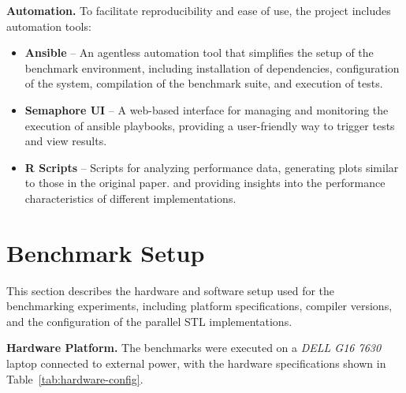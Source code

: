 \documentclass[sigconf]{acmart}
\newcommand{\mypar}[1]{{\bf #1.}}
\begin{document}
\mypar{Automation} To facilitate reproducibility and ease of use, the project includes automation tools:
\begin{itemize}
      \item \textbf{Ansible} – An agentless automation tool that simplifies the setup of the benchmark environment,
            including installation of dependencies, configuration of the system, compilation of the benchmark suite, and execution of tests.
      \item \textbf{Semaphore UI} – A web-based interface for managing and monitoring the execution of ansible playbooks,
            providing a user-friendly way to trigger tests and view results.
      \item \textbf{R Scripts} – Scripts for analyzing performance data, generating plots similar to those in the original paper.
            and providing insights into the performance characteristics of different implementations.
\end{itemize}

\section{Benchmark Setup}\label{sec:benchmark_setup}

This section describes the hardware and software setup used for the
benchmarking experiments, including platform specifications, compiler versions,
and the configuration of the parallel STL implementations.

\mypar{Hardware Platform}
The benchmarks were executed on a \textit{DELL G16 7630} laptop connected to external power,
with the hardware specifications shown in Table~\ref{tab:hardware-config}.
\end{document}
